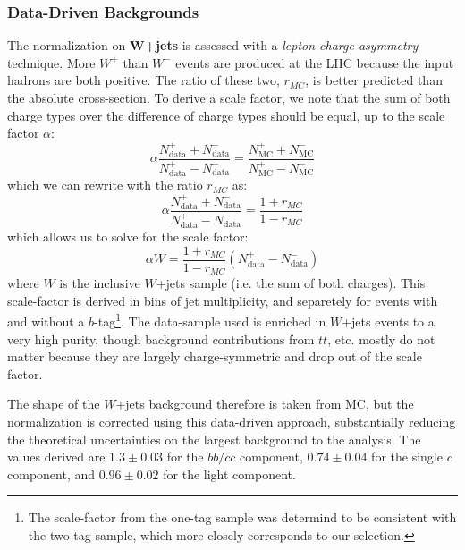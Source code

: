 	\subsubsection{Data-Driven Backgrounds}

The normalization on \textbf{$\mathbf{W}$+jets} is assessed with a \textit{lepton-charge-asymmetry} technique. More $W^+$ than $W^-$ events are produced at the LHC because the input hadrons are both positive. The ratio of these two, $r_{MC}$, is better predicted than the absolute cross-section. To derive a scale factor, we note that the sum of both charge types over the difference of charge types should be equal, up to the scale factor $\alpha$:
%
\begin{equation}
\alpha \frac{N_\mathrm{data}^+ + N_\mathrm{data}^-}{N_\mathrm{data}^+ - N_\mathrm{data}^-} = \frac{N_\mathrm{MC}^+ + N_\mathrm{MC}^-}{N_\mathrm{MC}^+ - N_\mathrm{MC}^-}
\end{equation}
% 
which we can rewrite with the ratio $r_{MC}$ as:
%
\begin{equation}
\alpha \frac{N_\mathrm{data}^+ + N_\mathrm{data}^-}{N_\mathrm{data}^+ - N_\mathrm{data}^-} = \frac{1 + r_{MC}}{1 - r_{MC}}
\end{equation}
%
which allows us to solve for the scale factor:
%
\begin{equation}
\alpha W = \frac{1 + r_{MC}}{1 - r_{MC}} \left( N_\mathrm{data}^+ - N_\mathrm{data}^- \right)
\end{equation}
%
where $W$ is the inclusive $W$+jets sample (i.e. the sum of both charges). This scale-factor is derived in bins of jet multiplicity, and separetely for events with and without a $b$-tag\footnote{The scale-factor from the one-tag sample was determind to be consistent with the two-tag sample, which more closely corresponds to our selection.}. The data-sample used is enriched in $W$+jets events to a very high purity, though background contributions from $t\bar{t}$, etc. mostly do not matter because they are largely charge-symmetric and drop out of the scale factor.

The shape of the $W$+jets background therefore is taken from MC, but the normalization is corrected using this data-driven approach, substantially reducing the theoretical uncertainties on the largest background to the analysis. The values derived are $1.3 \pm 0.03$ for the $bb/cc$ component, $0.74 \pm 0.04$ for the single $c$ component, and $0.96 \pm 0.02$ for the light component.

